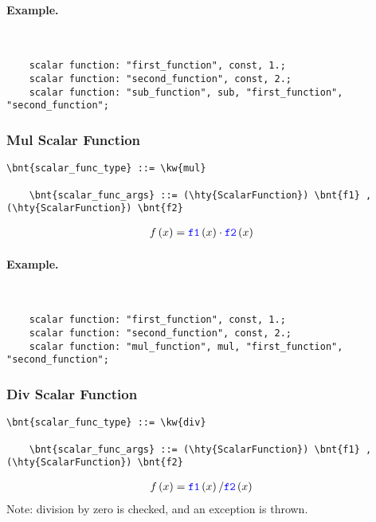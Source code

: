 \paragraph{Example.} \
\begin{verbatim}
    scalar function: "first_function", const, 1.;
    scalar function: "second_function", const, 2.;
    scalar function: "sub_function", sub, "first_function", "second_function";
\end{verbatim}

\subsubsection{Mul Scalar Function}
\begin{Verbatim}[commandchars=\\\{\}]
    \bnt{scalar_func_type} ::= \kw{mul}

    \bnt{scalar_func_args} ::= (\hty{ScalarFunction}) \bnt{f1} , (\hty{ScalarFunction}) \bnt{f2}
\end{Verbatim}
\begin{align}
	f\left( x \right)
	&=
	\textcolor{blue}{\texttt{f1}}\left( x \right) \cdot \textcolor{blue}{\texttt{f2}}\left( x \right)
\end{align}

\paragraph{Example.} \
\begin{verbatim}
    scalar function: "first_function", const, 1.;
    scalar function: "second_function", const, 2.;
    scalar function: "mul_function", mul, "first_function", "second_function";
\end{verbatim}

\subsubsection{Div Scalar Function}
\begin{Verbatim}[commandchars=\\\{\}]
    \bnt{scalar_func_type} ::= \kw{div}

    \bnt{scalar_func_args} ::= (\hty{ScalarFunction}) \bnt{f1} , (\hty{ScalarFunction}) \bnt{f2}
\end{Verbatim}
\begin{align}
	f\left( x \right)
	&=
	\textcolor{blue}{\texttt{f1}}\left( x \right) / \textcolor{blue}{\texttt{f2}}\left( x \right)
\end{align}
Note: division by zero is checked, and an exception is thrown.

